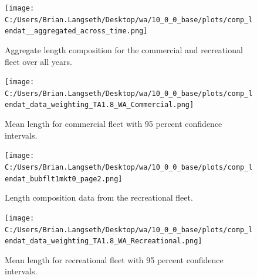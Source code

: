 \documentclass[11pt,
  english,
  a4paper,
]{article}
\begin{document}
\tagmcend\tagstructend


\begin{figure}
\centering
\texttt{[image: C:/Users/Brian.Langseth/Desktop/wa/10\_0\_0\_base/plots/comp\_lendat\_\_aggregated\_across\_time.png]}
\caption{Aggregate length composition for the commercial and recreational fleet over all years.\label{fig:wa-len-agg}}
\end{figure}

\tagmcend\tagstructend


\begin{figure}
\centering
\texttt{[image: C:/Users/Brian.Langseth/Desktop/wa/10\_0\_0\_base/plots/comp\_lendat\_data\_weighting\_TA1.8\_WA\_Commercial.png]}
\caption{Mean length for commercial fleet with 95 percent confidence intervals.\label{fig:mean-com-len-data}}
\end{figure}

\tagmcend\tagstructend


\begin{figure}
\centering
\texttt{[image: C:/Users/Brian.Langseth/Desktop/wa/10\_0\_0\_base/plots/comp\_lendat\_bubflt1mkt0\_page2.png]}
\caption{Length composition data from the recreational fleet.\label{fig:rec-len-data}}
\end{figure}

\tagmcend\tagstructend


\begin{figure}
\centering
\texttt{[image: C:/Users/Brian.Langseth/Desktop/wa/10\_0\_0\_base/plots/comp\_lendat\_data\_weighting\_TA1.8\_WA\_Recreational.png]}
\caption{Mean length for recreational fleet with 95 percent confidence intervals.\label{fig:mean-rec-len-data}}
\end{figure}

\tagmcend\tagstructend

\end{document}
